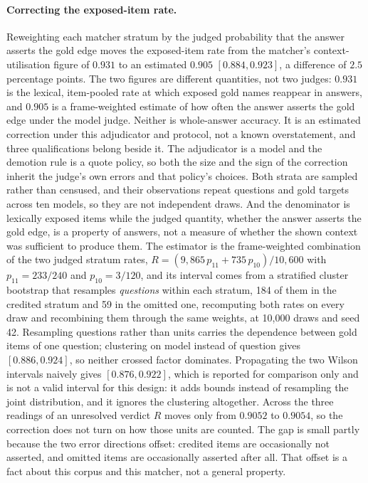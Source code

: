 \documentclass[10pt,twocolumn]{article}
\begin{document}
\paragraph{Correcting the exposed-item rate.} Reweighting each matcher stratum by the judged probability that the answer asserts the gold edge moves the exposed-item rate from the matcher's context-utilisation figure of $0.931$ to an estimated $\mathbf{0.905}$ $[0.884,0.923]$, a difference of $2.5$ percentage points. The two figures are different quantities, not two judges: $0.931$ is the lexical, item-pooled rate at which exposed gold names reappear in answers, and $0.905$ is a frame-weighted estimate of how often the answer asserts the gold edge under the model judge. Neither is whole-answer accuracy. It is an estimated correction under this adjudicator and protocol, not a known overstatement, and three qualifications belong beside it. The adjudicator is a model and the demotion rule is a quote policy, so both the size and the sign of the correction inherit the judge's own errors and that policy's choices. Both strata are sampled rather than censused, and their observations repeat questions and gold targets across ten models, so they are not independent draws. And the denominator is lexically exposed items while the judged quantity, whether the answer asserts the gold edge, is a property of answers, not a measure of whether the shown context was sufficient to produce them. The estimator is the frame-weighted combination of the two judged stratum rates, $R=(9{,}865\,p_{11}+735\,p_{10})/10{,}600$ with $p_{11}=233/240$ and $p_{10}=3/120$, and its interval comes from a stratified cluster bootstrap that resamples \emph{questions} within each stratum, 184 of them in the credited stratum and 59 in the omitted one, recomputing both rates on every draw and recombining them through the same weights, at 10{,}000 draws and seed 42. Resampling questions rather than units carries the dependence between gold items of one question; clustering on model instead of question gives $[0.886,0.924]$, so neither crossed factor dominates. Propagating the two Wilson intervals naively gives $[0.876,0.922]$, which is reported for comparison only and is not a valid interval for this design: it adds bounds instead of resampling the joint distribution, and it ignores the clustering altogether. Across the three readings of an unresolved verdict $R$ moves only from $0.9052$ to $0.9054$, so the correction does not turn on how those units are counted. The gap is small partly because the two error directions offset: credited items are occasionally not asserted, and omitted items are occasionally asserted after all. That offset is a fact about this corpus and this matcher, not a general property.
\end{document}
